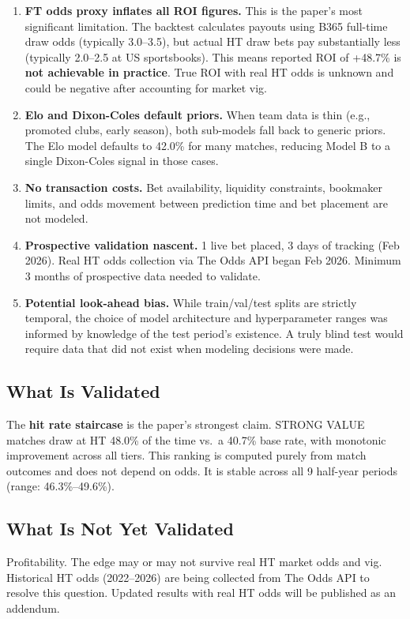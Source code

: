 \documentclass[11pt, letterpaper]{article}
\begin{document}
\begin{enumerate}[leftmargin=1.5em, itemsep=4pt]
  \item \textbf{FT odds proxy inflates all ROI figures.} This is the paper's most significant limitation. The backtest calculates payouts using B365 full-time draw odds (typically 3.0--3.5), but actual HT draw bets pay substantially less (typically 2.0--2.5 at US sportsbooks). This means reported ROI of +48.7\% is \textbf{not achievable in practice}. True ROI with real HT odds is unknown and could be negative after accounting for market vig.
  \item \textbf{Elo and Dixon-Coles default priors.} When team data is thin (e.g., promoted clubs, early season), both sub-models fall back to generic priors. The Elo model defaults to 42.0\% for many matches, reducing Model B to a single Dixon-Coles signal in those cases.
  \item \textbf{No transaction costs.} Bet availability, liquidity constraints, bookmaker limits, and odds movement between prediction time and bet placement are not modeled.
  \item \textbf{Prospective validation nascent.} 1 live bet placed, 3 days of tracking (Feb 2026). Real HT odds collection via The Odds API began Feb 2026. Minimum 3 months of prospective data needed to validate.
  \item \textbf{Potential look-ahead bias.} While train/val/test splits are strictly temporal, the choice of model architecture and hyperparameter ranges was informed by knowledge of the test period's existence. A truly blind test would require data that did not exist when modeling decisions were made.
\end{enumerate}

\subsection{What Is Validated}
The \textbf{hit rate staircase} is the paper's strongest claim. STRONG VALUE matches draw at HT 48.0\% of the time vs.\ a 40.7\% base rate, with monotonic improvement across all tiers. This ranking is computed purely from match outcomes and does not depend on odds. It is stable across all 9 half-year periods (range: 46.3\%--49.6\%).

\subsection{What Is Not Yet Validated}
Profitability. The edge may or may not survive real HT market odds and vig. Historical HT odds (2022--2026) are being collected from The Odds API to resolve this question. Updated results with real HT odds will be published as an addendum.
\end{document}
